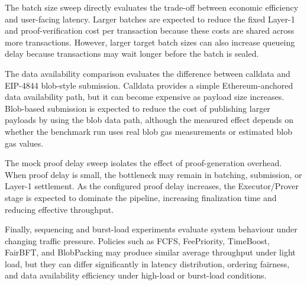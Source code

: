 The batch size sweep directly evaluates the trade-off between economic efficiency and user-facing latency. Larger batches are expected to reduce the fixed Layer-1 and proof-verification cost per transaction because these costs are shared across more transactions. However, larger target batch sizes can also increase queueing delay because transactions may wait longer before the batch is sealed.

The data availability comparison evaluates the difference between calldata and EIP-4844 blob-style submission. Calldata provides a simple Ethereum-anchored data availability path, but it can become expensive as payload size increases. Blob-based submission is expected to reduce the cost of publishing larger payloads by using the blob data path, although the measured effect depends on whether the benchmark run uses real blob gas measurements or estimated blob gas values.

The mock proof delay sweep isolates the effect of proof-generation overhead. When proof delay is small, the bottleneck may remain in batching, submission, or Layer-1 settlement. As the configured proof delay increases, the Executor/Prover stage is expected to dominate the pipeline, increasing finalization time and reducing effective throughput.

Finally, sequencing and burst-load experiments evaluate system behaviour under changing traffic pressure. Policies such as FCFS, FeePriority, TimeBoost, FairBFT, and BlobPacking may produce similar average throughput under light load, but they can differ significantly in latency distribution, ordering fairness, and data availability efficiency under high-load or burst-load conditions.